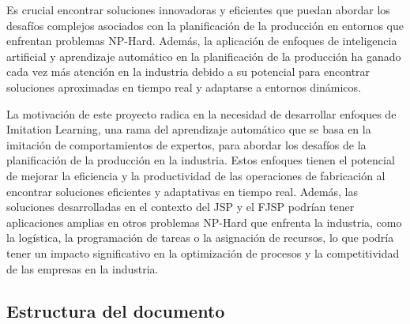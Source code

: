 Es crucial encontrar soluciones innovadoras y eficientes que puedan abordar 
los desafíos complejos asociados con la planificación de la producción en entornos que enfrentan 
problemas NP-Hard. Además, la aplicación de enfoques de inteligencia artificial y aprendizaje 
automático en la planificación de la producción ha ganado cada vez más atención en la industria 
debido a su potencial para encontrar soluciones aproximadas en tiempo real y adaptarse a 
entornos dinámicos.\medskip

La motivación de este proyecto radica en la necesidad de desarrollar enfoques de Imitation 
Learning, una rama del aprendizaje automático que se basa en la imitación de comportamientos 
de expertos, para abordar los desafíos de la planificación de la producción en la industria. 
Estos enfoques tienen el potencial de mejorar la eficiencia y la productividad de las operaciones 
de fabricación al encontrar soluciones eficientes y adaptativas en tiempo real. Además, las 
soluciones desarrolladas en el contexto del JSP y el FJSP podrían tener aplicaciones amplias 
en otros problemas NP-Hard que enfrenta la industria, como la logística, la programación de 
tareas o la asignación de recursos, lo que podría tener un impacto significativo en la 
optimización de procesos y la competitividad de las empresas en la industria.
\subsection{Estructura del documento}


\pagebreak